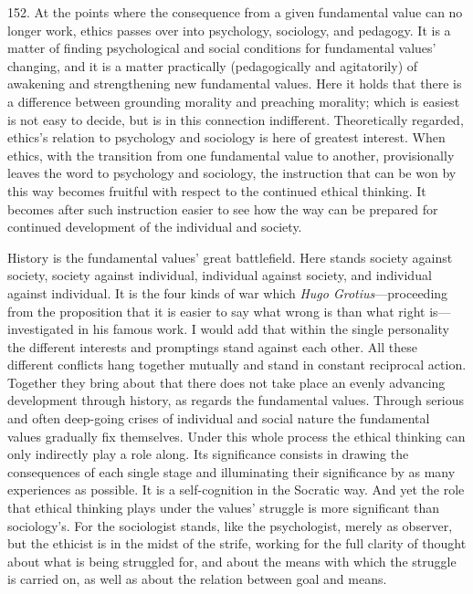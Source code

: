 \documentclass[12pt,a4paper]{book}
\newcommand{\opage}[1]{\marginnote{\footnotesize\textit{[#1]}}}
\begin{document}
152. At the points where the consequence from a given fundamental value can no longer work, ethics passes over
into psychology, sociology, and pedagogy. It is a matter of finding psychological and social conditions for
fundamental values' changing, and it is a matter practically (pedagogically and agitatorily) of awakening and
strengthening new fundamental values. Here it holds that there is a difference between grounding morality and
preaching morality; which is easiest is not easy to decide, but is in this connection indifferent. Theoretically
regarded, ethics's relation to psychology and sociology is here of greatest interest. When ethics, with the
transition from one fundamental value to another, provisionally leaves the word to psychology and sociology, the
instruction that can be won by this way becomes fruitful with respect to the continued ethical thinking. It
becomes after such instruction easier to see how the way can be prepared for continued development of the
individual and society.

History is the fundamental values' great battlefield. Here stands society against society, society against
individual, individual against society, and individual against individual. It is the four kinds of war which
\emph{Hugo Grotius}---proceeding from the proposition that it is easier to say what wrong is than what right
is---investigated in his famous work. I would add that within the single personality the different interests and
promptings stand against each other. All these different \opage{364}conflicts hang together mutually and stand in constant
reciprocal action. Together they bring about that there does not take place an evenly advancing development through
history, as regards the fundamental values. Through serious and often deep-going crises of individual and social
nature the fundamental values gradually fix themselves. Under this whole process the ethical thinking can only
indirectly play a role along. Its significance consists in drawing the consequences of each single stage and
illuminating their significance by as many experiences as possible. It is a self-cognition in the Socratic way.
And yet the role that ethical thinking plays under the values' struggle is more significant than sociology's. For
the sociologist stands, like the psychologist, merely as observer, but the ethicist is in the midst of the strife,
working for the full clarity of thought about what is being struggled for, and about the means with which the
struggle is carried on, as well as about the relation between goal and means.
\end{document}
